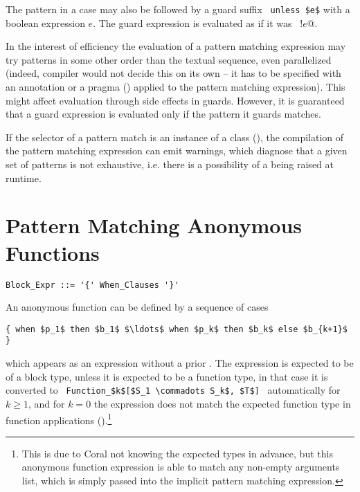 The pattern in a case may also be followed by a guard suffix ~\lstinline!unless $e$! with a boolean expression $e$. The guard expression is evaluated as if it was ~\lstinline@if !$e$@. 

In the interest of efficiency the evaluation of a pattern matching expression may try patterns in some other order than the textual sequence, even parallelized (indeed, compiler would not decide this on its own -- it has to be specified with an annotation or a pragma () applied to the pattern matching expression). This might affect evaluation through side effects in guards. However, it is guaranteed that a guard expression is evaluated only if the pattern it guards matches.

If the selector of a pattern match is an instance of a  class (), the compilation of the pattern matching expression can emit warnings, which diagnose that a given set of patterns is not exhaustive, i.e. there is a possibility of a  being raised at runtime. 






\section{Pattern Matching Anonymous Functions}
\label{sec:pattern-matching-anon-fun}

\syntax\begin{lstlisting}
Block_Expr ::= '{' When_Clauses '}'
\end{lstlisting}

An anonymous function can be defined by a sequence of cases
\begin{lstlisting}
{ when $p_1$ then $b_1$ $\ldots$ when $p_k$ then $b_k$ else $b_{k+1}$ }
\end{lstlisting}
which appears as an expression without a prior . The expression is expected to be of a block type, unless it is expected to be a function type, in that case it is converted to ~\lstinline!Function_$k$[$S_1 \commadots S_k$, $T$]!~ automatically for $k \geq 1$, and for $k = 0$ the expression does not match the expected function type in function applications ().\footnote{This is due to Coral not knowing the expected types in advance, but this anonymous function expression is able to match any non-empty arguments list, which is simply passed into the implicit pattern matching expression.} 

